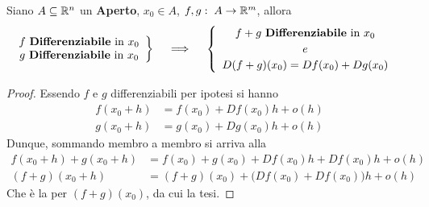 \begin{proposition}
	\label{prop:diff_somma_funz}
	Siano $A \subseteq \mathbb{R}^n$ un \textbf{Aperto}, $x_0 \in A$, $f, g:\; A \to \mathbb{R}^m$, allora
	\[
		\left.
		\begin{array}{c}
			f \text{ \textbf{Differenziabile} in } x_0\\
			g \text{ \textbf{Differenziabile} in } x_0
		\end{array}
		\right\}
		\quad \implies \quad
		\begin{cases}
			\begin{array}{c}
				f + g \text{ \textbf{Differenziabile} in } x_0\\
				e\\
				D(f + g)(x_0) = Df(x_0) + Dg(x_0)
			\end{array}
		\end{cases}
	\]
	\begin{proof}
		Essendo $f$ e $g$ differenziabili per ipotesi si hanno
		\begin{align*}
			f(x_0 + h) &= f(x_0) + Df(x_0)h + o(h)\\
			g(x_0 + h) &= g(x_0) + Dg(x_0)h + o(h)
		\end{align*}
		Dunque, sommando membro a membro si arriva alla
		\begin{align*}
			f(x_0 + h) + g(x_0 + h) &= f(x_0) + g(x_0) + Df(x_0)h + Df(x_0)h + o(h)\\
			(f + g)(x_0 + h) &= (f + g)(x_0) + \bigl( Df(x_0) + Df(x_0) \bigr) h + o(h)
		\end{align*}
		Che è la  per $(f + g)(x_0)$, da cui la tesi.
	\end{proof}
\end{proposition}
